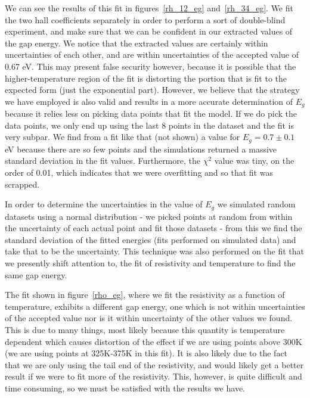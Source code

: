 \documentclass[reprint, nobibnotes, amssymb, amsmath, amsfonts, physics, mathtools, mathrsfs, floatfix]{revtex4-1}
\begin{document}
    We can see the results of this fit in figures~\ref{rh_12_eg} and~\ref{rh_34_eg}.  We fit the two hall coefficients separately in order to perform a sort of double-blind experiment, and make sure that we can be confident in our extracted values of the gap energy.  We notice that the extracted values are certainly within uncertainties of each other, and are within uncertainties of the accepted value of 0.67 eV.  This may present false security however, because it is possible that the higher-temperature region of the fit is distorting the portion that is fit to the expected form (just the exponential part).  However, we believe that the strategy we have employed is also valid and results in a more accurate determination of $E_g$ because it relies less on picking data points that fit the model.  If we do pick the data points, we only end up using the last 8 points in the dataset and the fit is very subpar.  We find from a fit like that (not shown) a value for $E_g = 0.7 \pm 0.1$ eV because there are so few points and the simulations returned a massive standard deviation in the fit values.  Furthermore, the $\chi^2$ value was tiny, on the order of 0.01, which indicates that we were overfitting and so that fit was scrapped.

    In order to determine the uncertainties in the value of $E_g$ we simulated random datasets using a normal distribution - we picked points at random from within the uncertainty of each actual point and fit those datasets - from this we find the standard deviation of the fitted energies (fits performed on simulated data) and take that to be the uncertainty.  This technique was also performed on the fit that we presently shift attention to, the fit of resistivity and temperature to find the same gap energy.

    The fit shown in figure~\ref{rho_eg}, where we fit the resistivity as a function of temperature, exhibits a different gap energy, one which is not within uncertainties of the accepted value nor is it within uncertainty of the other values we found.  This is due to many things, most likely because this quantity is temperature dependent which causes distortion of the effect if we are using points above 300K (we are using points at 325K-375K in this fit).  It is also likely due to the fact that we are only using the tail end of the resistivity, and would likely get a better result if we were to fit more of the resistivity.  This, however, is quite difficult and time consuming, so we must be satisfied with the results we have.
\end{document}

